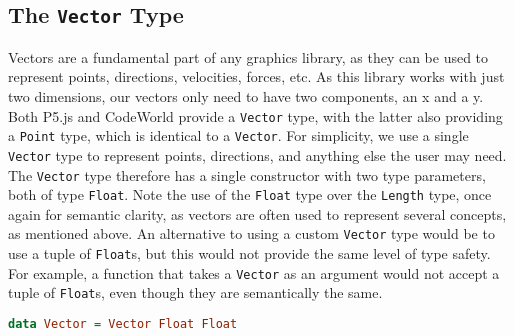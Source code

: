 \documentclass[../main.tex]{subfiles}
\begin{document}
        \subsection{The \texttt{Vector}
            Type} Vectors are a fundamental part of any graphics library, as they can be
                used to represent points, directions, velocities, forces, etc. As this library
                works with just two dimensions, our vectors only need to have two components,
                an x and a y.
            Both P5.js and CodeWorld provide a \texttt{Vector} type, with the latter also
                providing a \texttt{Point} type, which is identical to a \texttt{Vector}.
            For simplicity, we use a single \texttt{Vector} type to represent points,
                directions, and anything else the user may need.
            The \texttt{Vector} type therefore has a single constructor with two type
                parameters, both of type \texttt{Float}.
            Note the use of the \texttt{Float} type over the \texttt{Length} type, once
                again for semantic clarity, as vectors are often used to represent several
                concepts, as mentioned above.
            An alternative to using a custom \texttt{Vector} type would be to use a tuple
                of \texttt{Float}s, but this would not provide the same level of type safety.
            For example, a function that takes a \texttt{Vector} as an argument would not
                accept a tuple of \texttt{Float}s, even though they are semantically the same.

            \begin{lstlisting}[language={Haskell}, label={lst:vector}, caption={The \texttt{Vector} type definition.}]
data Vector = Vector Float Float\end{lstlisting}
\end{document}
